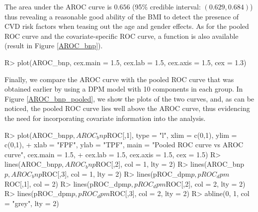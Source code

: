 The area under the AROC curve is $0.656$ (95\% credible interval: $(0.629, 0.684)$) thus revealing a reasonable good ability of the BMI to detect the presence of CVD risk factors when teasing out the age and gender effects. As for the pooled ROC curve and the covariate-specific ROC curve, a  function is also available (result in Figure \ref{AROC_bnp}).
\begin{example}
R> plot(AROC_bnp, cex.main = 1.5, cex.lab = 1.5, cex.axis = 1.5, cex = 1.3) 
\end{example}
Finally, we compare the AROC curve with the pooled ROC curve that was obtained earlier by using a DPM model with 10 components in each group. In Figure \ref{AROC_bnp_pooled}, we show the plots of the two curves, and, as can be noticed, the pooled ROC curve lies well above the AROC curve, thus evidencing the need for incorporating covariate information into the analysis.
\begin{example}
R> plot(AROC_bnp$p, AROC_bnp$ROC[,1], type = "l", xlim = c(0,1), ylim = c(0,1),
+ xlab = "FPF", ylab = "TPF", main = "Pooled ROC curve vs AROC curve", cex.main = 1.5, 
+ cex.lab = 1.5, cex.axis = 1.5, cex = 1.5)
R> lines(AROC_bnp$p, AROC_bnp$ROC[,2], col = 1, lty = 2)
R> lines(AROC_bnp$p, AROC_bnp$ROC[,3], col = 1, lty = 2)
R> lines(pROC_dpm$p, pROC_dpm$ROC[,1], col = 2)
R> lines(pROC_dpm$p, pROC_dpm$ROC[,2], col = 2, lty = 2)
R> lines(pROC_dpm$p, pROC_dpm$ROC[,3], col = 2, lty = 2)
R> abline(0, 1, col = "grey", lty = 2)
\end{example}
